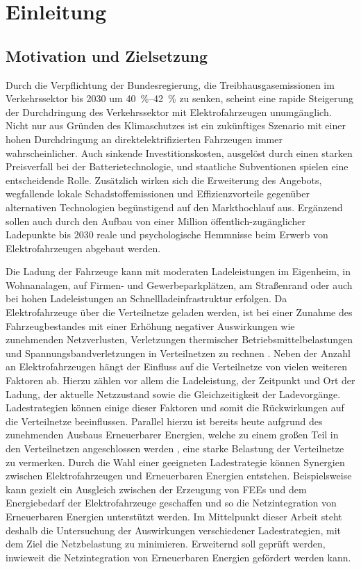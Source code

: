 \section{Einleitung}


\subsection{Motivation und Zielsetzung}

Durch die Verpflichtung der Bundesregierung, die Treibhausgasemissionen im Verkehrssektor bis \num{2030} um \SIrange[range-phrase=~bis~]{40}{42}{\percent} \cite{BundesministeriumUmwelt2019} zu senken, scheint eine rapide Steigerung der Durchdringung des Verkehrssektor mit Elektrofahrzeugen unumgänglich.
Nicht nur aus Gründen des Klimaschutzes ist ein zukünftiges Szenario mit einer hohen Durchdringung an direktelektrifizierten Fahrzeugen immer wahrscheinlicher.
Auch sinkende Investitionskosten, ausgelöst durch einen starken Preisverfall bei der Batterietechnologie, und staatliche Subventionen spielen eine entscheidende Rolle.
Zusätzlich wirken sich die Erweiterung des Angebots, wegfallende lokale Schadstoffemissionen und Effizienzvorteile gegenüber alternativen Technologien begünstigend auf den Markthochlauf aus.
Ergänzend sollen auch durch den Aufbau von einer Million öffentlich-zugänglicher Ladepunkte bis \num{2030} \cite{DieBundesregierung2019} reale und psychologische Hemmnisse beim Erwerb von Elektrofahrzeugen abgebaut werden.\medskip

Die Ladung der Fahrzeuge kann mit moderaten Ladeleistungen im Eigenheim, in Wohnanalagen, auf Firmen- und Gewerbeparkplätzen, am Straßenrand oder auch bei hohen Ladeleistungen an Schnellladeinfrastruktur erfolgen.
Da Elektrofahrzeuge über die Verteilnetze geladen werden, ist bei einer Zunahme des Fahrzeugbestandes mit einer Erhöhung negativer Auswirkungen wie zunehmenden Netzverlusten, Verletzungen thermischer Betriebsmittelbelastungen und Spannungsbandverletzungen in Verteilnetzen zu rechnen \cite{Dharmakeerthi2011}.
Neben der Anzahl an Elektrofahrzeugen hängt der Einfluss auf die Verteilnetze von vielen weiteren Faktoren ab.
Hierzu zählen vor allem die Ladeleistung, der Zeitpunkt und Ort der Ladung, der aktuelle Netzzustand sowie die Gleichzeitigkeit der Ladevorgänge.
Ladestrategien können einige dieser Faktoren und somit die Rückwirkungen auf die Verteilnetze beeinflussen.
Parallel hierzu ist bereits heute aufgrund des zunehmenden Ausbaus Erneuerbarer Energien, welche zu einem großen Teil in den Verteilnetzen angeschlossen werden \cite{AgoraEnergiewende2017}, eine starke Belastung der Verteilnetze zu vermerken.
Durch die Wahl einer geeigneten Ladestrategie können Synergien zwischen Elektrofahrzeugen und Erneuerbaren Energien entstehen.
Beispielsweise kann gezielt ein Ausgleich zwischen der Erzeugung von \glspl{FEE} und dem Energiebedarf der Elektrofahrzeuge geschaffen und so die Netzintegration von Erneuerbaren Energien unterstützt werden.
Im Mittelpunkt dieser Arbeit steht deshalb die Untersuchung der Auswirkungen verschiedener Ladestrategien, mit dem Ziel die Netzbelastung zu minimieren.
Erweiternd soll geprüft werden, inwieweit die Netzintegration von Erneuerbaren Energien gefördert werden kann.\medskip

